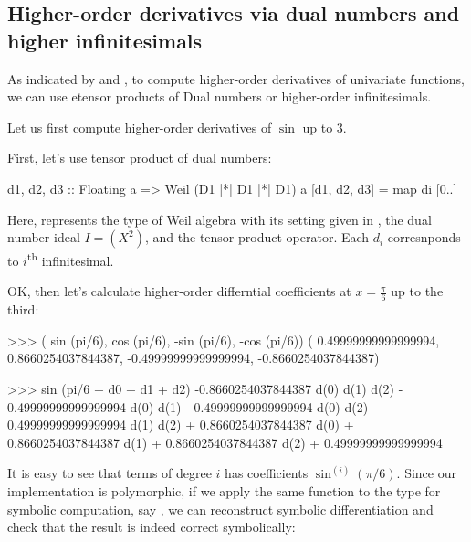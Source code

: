 \documentclass[%
  sigconf,authorversion,screen]{acmart}
\begin{document}
\subsection{Higher-order derivatives via dual numbers and higher infinitesimals}
As indicated by  and ,
to compute higher-order derivatives of univariate functions, we can use etensor products of Dual numbers or higher-order infinitesimals.

Let us first compute higher-order derivatives of $\sin$ up to $3$.

First, let's use tensor product of dual numbers:
\begin{code}
d1, d2, d3
  :: Floating a
  => Weil (D1 |*| D1 |*| D1) a
[d1, d2, d3] = map di [0..]
\end{code}

Here,  represents the type of Weil algebra with its setting given in ,  the dual number ideal $I = (X^2)$, and \hask{|*|} the tensor product operator.
Each $d_i$ corresnponds to $i$\textsuperscript{th} infinitesimal.

OK, then let's calculate higher-order differntial coefficients at $x = \frac{\pi}{6}$ up to the third:

\begin{code}
>>> ( sin (pi/6),  cos (pi/6), 
     -sin (pi/6), -cos (pi/6))
( 0.49999999999999994,
  0.8660254037844387,
 -0.49999999999999994,
 -0.8660254037844387)

>>> sin (pi/6 + d0 + d1 + d2)
-0.8660254037844387 d(0) d(1) d(2) 
  - 0.49999999999999994 d(0) d(1) 
  - 0.49999999999999994 d(0) d(2)
  - 0.49999999999999994 d(1) d(2) 
  + 0.8660254037844387 d(0) 
  + 0.8660254037844387 d(1) 
  + 0.8660254037844387 d(2) 
  + 0.49999999999999994
\end{code}

It is easy to see that terms of degree $i$ has coefficients $\sin^{(i)}(\pi/6)$.
Since our implementation is polymorphic, if we apply the same function to the type for symbolic computation, say , we can reconstruct symbolic differentiation and check that the result is indeed correct symbolically:

\end{document}
